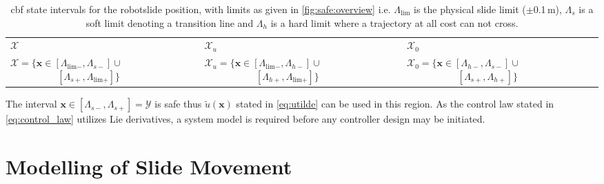 \vspace{-1mm}
\begin{table}[H]
	\begin{tabularx}{\textwidth}{X X X }
\rowcolor{HeaderBlue} 
$\mathcal{X}$ & $\mathcal{X}_u$  & $\mathcal{X}_0$ \\
$ \mathcal{X}=\{\mathbf{x} \in[\Lambda_{\text{lim}-},\Lambda_{s-}] \cup$ \newline $\phantom{\mathcal{X}=\{\mathbf{x} \in} \,\, [\Lambda_{s+},\Lambda_{\text{lim}+}]\}$  & $\mathcal{X}_u = \{\mathbf{x} \in [\Lambda_{\text{lim}-},\Lambda_{h-}] \cup$ \newline $\phantom{\mathcal{X}_u=\{\mathbf{x} \in} \,\, [\Lambda_{h+},\Lambda_{\text{lim}+}]\} $ & $\mathcal{X}_0 = \{\mathbf{x} \in [\Lambda_{h-},\Lambda_{s-}] \cup$ \newline $\phantom{\mathcal{X}_0=\{\mathbf{x} \in} \,\, [\Lambda_{s+},\Lambda_{h+}]\}$  \\
\end{tabularx}
\caption{\gls{cbf} state intervals for the robotslide position, with limits as given in \autoref{fig:safe:overview} i.e. $\Lambda_\text{lim}$ is the physical slide limit ($\pm$0.1\,m), $\Lambda_s$ is a soft limit denoting a transition line and $\Lambda_h$ is a hard limit where a trajectory at all cost can not cross. }
\label{tab:intervals}
\end{table}
The interval $\mathbf{x} \in [\Lambda_{s-},\Lambda_{s+}] = \mathcal{Y}$ is safe thus $\tilde{u}(\mathbf{x})$ stated in \autoref{eq:utilde} can be used in this region.
As the control law stated in \autoref{eq:control_law} utilizes Lie derivatives, a system model is required before any controller design may be initiated.

\section{Modelling of Slide Movement}\label{sec:model_slide}

